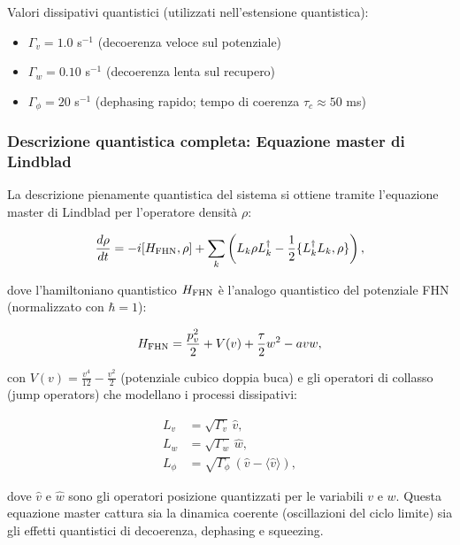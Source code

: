 \documentclass[11pt,a4paper]{article}
\theoremstyle{plain}
\theoremstyle{definition}
\begin{document}
Valori dissipativi quantistici (utilizzati nell’estensione quantistica):
\begin{itemize}
    \item $\Gamma_v = 1.0$ s$^{-1}$ \quad (decoerenza veloce sul potenziale)
    \item $\Gamma_w = 0.10$ s$^{-1}$ \quad (decoerenza lenta sul recupero)
    \item $\Gamma_\phi = 20$ s$^{-1}$ \quad (dephasing rapido; tempo di coerenza $\tau_c \approx 50$ ms)
\end{itemize}

\subsubsection{Descrizione quantistica completa: Equazione master di Lindblad}

La descrizione pienamente quantistica del sistema si ottiene tramite l’equazione master di Lindblad per l’operatore densità $\rho$:

\begin{equation}
    \frac{d\rho}{dt} = -i [H_{\rm FHN}, \rho] + \sum_{k} \left( L_k \rho L_k^\dagger - \frac{1}{2} \{L_k^\dagger L_k, \rho\} \right),
    \label{eq:lindblad-fhn}
\end{equation}

dove l’hamiltoniano quantistico $H_{\rm FHN}$ è l’analogo quantistico del potenziale FHN (normalizzato con $\hbar = 1$):

\begin{equation}
H_{\rm FHN} = \frac{p_v^2}{2} + V(v) + \frac{\tau}{2} w^2 - a v w,
\label{eq:H_fhn_quant}
\end{equation}

con $V(v) = \frac{v^4}{12} - \frac{v^2}{2}$ (potenziale cubico doppia buca) e gli operatori di collasso (jump operators) che modellano i processi dissipativi:

\begin{align}
    L_v &= \sqrt{\Gamma_v} \, \hat{v}, \\
    L_w &= \sqrt{\Gamma_w} \, \hat{w}, \\
    L_\phi &= \sqrt{\Gamma_\phi} \, (\hat{v} - \langle \hat{v} \rangle),
    \label{eq:jump_operators_fhn}
\end{align}

dove $\hat{v}$ e $\hat{w}$ sono gli operatori posizione quantizzati per le variabili $v$ e $w$. Questa equazione master cattura sia la dinamica coerente (oscillazioni del ciclo limite) sia gli effetti quantistici di decoerenza, dephasing e squeezing. 
\end{document}
